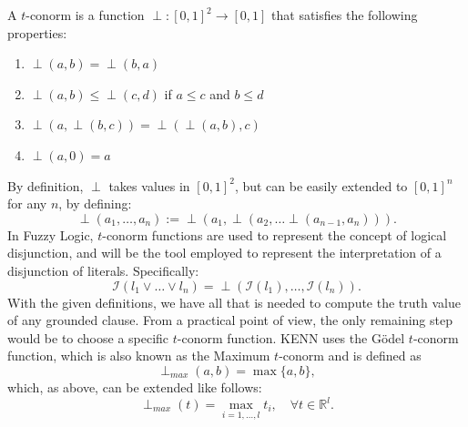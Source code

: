 \begin{definition}[$t$-conorm ]
	A $t$-conorm is a function $\perp: \left[0,1 \right]^2 \rightarrow \left[0,1 \right]$ that satisfies the following properties:
	\begin{enumerate}
		\item $\perp(a, b)=\perp(b, a)$
		\item $\perp(a, b) \leq \perp(c, d)$ if $a \leq c$ and $b \leq d$
		\item $\perp(a, \perp(b, c))=\perp(\perp(a, b), c)$
		\item $\perp(a, 0)=a$
	\end{enumerate}
\end{definition}
By definition, $\perp$ takes values in $\left[0,1 \right]^2$, but can be easily extended to $\left[0,1 \right]^n$ for any $n$, by defining:
\begin{equation*}
\perp(a_1,\dots,a_n) := \perp(a_1,\perp(a_2,\dots \perp(a_{n-1},a_n))).
\end{equation*}
In Fuzzy Logic, $t$-conorm functions are used to represent the concept of logical disjunction, and will be the tool employed to represent the interpretation of a disjunction of literals. Specifically:
\begin{equation}
\mathcal{I}(l_1 \vee \dots \vee l_n) = \perp(\mathcal{I}(l_1),\dots,\mathcal{I}(l_n)).
\end{equation}
With the given definitions, we have all that is needed to compute the truth value of any grounded clause. From a practical point of view, the only remaining step would be to choose a specific $t$-conorm function. KENN uses the Gödel $t$-conorm function, which is also known as the Maximum $t$-conorm and is defined as
\begin{equation*}
\perp_{max}(a,b) = \max\{a,b\},
\end{equation*}
which, as above, can be extended like follows:
\begin{equation*}
\perp_{max}(t) = \max_{i=1,\dots,l} t_i, \quad \forall t \in \mathbb{R}^l.
\end{equation*}

